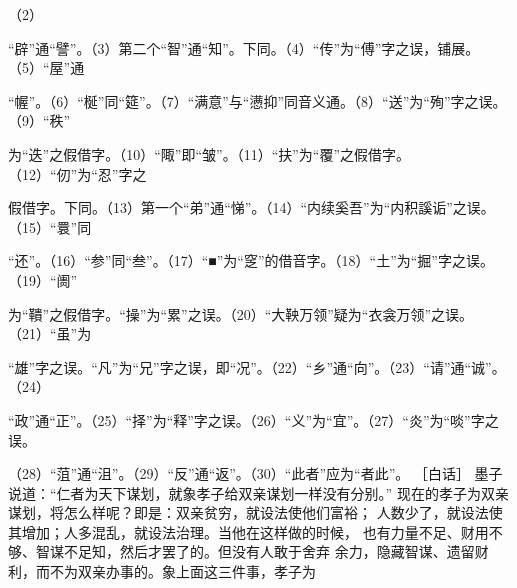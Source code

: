 \documentclass[12pt,UTF8]{ctexbook}
\begin{document}
（2） 

“辟”通“譬”。（3）第二个“智”通“知”。下同。（4）“传”为“傅”字之误，铺展。（5）“屋”通 

“幄”。（6）“梴”同“筵”。（7）“满意”与“懑抑”同音义通。（8）“送”为“殉”字之误。（9）“秩” 

为“迭”之假借字。（10）“陬”即“皱”。（11）“扶”为“覆”之假借字。（12）“仞”为“忍”字之 

假借字。下同。（13）第一个“弟”通“悌”。（14）“内续奚吾”为“内积謑诟”之误。（15）“睘”同 

“还”。（16）“参”同“叁”。（17）“■”为“窆”的借音字。（18）“土”为“掘”字之误。（19）“阓” 

为“鞼”之假借字。“操”为“累”之误。（20）“大鞅万领”疑为“衣衾万领”之误。（21）“虽”为 

“雄”字之误。“凡”为“兄”字之误，即“况”。（22）“乡”通“向”。（23）“请”通“诚”。（24） 

“政”通“正”。（25）“择”为“释”字之误。（26）“义”为“宜”。（27）“炎”为“啖”字之误。 

（28）“菹”通“沮”。（29）“反”通“返”。（30）“此者”应为“者此”。 
［白话］ 
墨子说道：“仁者为天下谋划，就象孝子给双亲谋划一样没有分别。” 
现在的孝子为双亲谋划，将怎么样呢？即是：双亲贫穷，就设法使他们富裕； 
人数少了，就设法使其增加；人多混乱，就设法治理。当他在这样做的时候， 
也有力量不足、财用不够、智谋不足知，然后才罢了的。但没有人敢于舍弃 
余力，隐藏智谋、遗留财利，而不为双亲办事的。象上面这三件事，孝子为 
\end{document}
